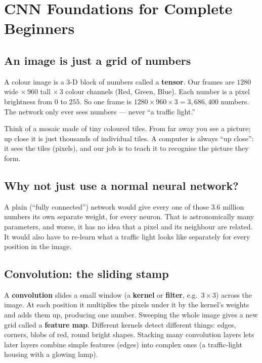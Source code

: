 \chapter{CNN Foundations for Complete Beginners}
\label{ch:cnn}

\section{An image is just a grid of numbers}
\begin{keyconcept}
A colour image is a 3-D block of numbers called a \textbf{tensor}. Our
frames are $1280$ wide $\times\,960$ tall $\times\,3$ colour channels
(Red, Green, Blue). Each number is a pixel brightness from $0$ to $255$.
So one frame is $1280\times960\times3 = 3{,}686{,}400$ numbers. The
network only ever sees numbers --- never ``a traffic light.''
\end{keyconcept}

\begin{analogy}
Think of a mosaic made of tiny coloured tiles. From far away you see a
picture; up close it is just thousands of individual tiles. A computer
is always ``up close'': it sees the tiles (pixels), and our job is to
teach it to recognise the picture they form.
\end{analogy}

\section{Why not just use a normal neural network?}
A plain (``fully connected'') network would give every one of those
$3.6$ million numbers its own separate weight, for every neuron. That is
astronomically many parameters, and worse, it has no idea that a pixel
and its neighbour are related. It would also have to re-learn what a
traffic light looks like separately for every position in the image.

\section{Convolution: the sliding stamp}
\begin{keyconcept}
A \textbf{convolution} slides a small window (a \textbf{kernel} or
\textbf{filter}, e.g.\ $3\times3$) across the image. At each position it
multiplies the pixels under it by the kernel's weights and adds them up,
producing one number. Sweeping the whole image gives a new grid called a
\textbf{feature map}. Different kernels detect different things: edges,
corners, blobs of red, round bright shapes. Stacking many convolution
layers lets later layers combine simple features (edges) into complex
ones (a traffic-light housing with a glowing lamp).
\end{keyconcept}

